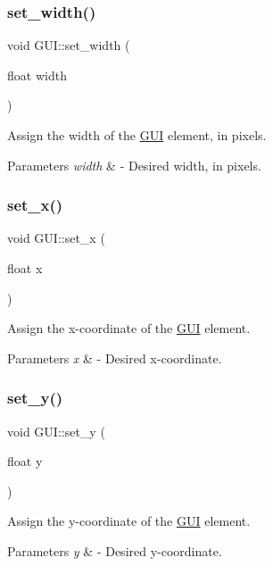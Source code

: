 \subsubsection{\texorpdfstring{set\+\_\+width()}{set\_width()}}
{\footnotesize\ttfamily void G\+U\+I\+::set\+\_\+width (\begin{DoxyParamCaption}\item[{float}]{width }\end{DoxyParamCaption})}

Assign the width of the \mbox{\hyperlink{class_g_u_i}{G\+UI}} element, in pixels. 
\begin{DoxyParams}{Parameters}
{\em width} & -\/ Desired width, in pixels. \\
\hline
\end{DoxyParams}
\mbox{\label{class_g_u_i_a677bae0d1184e72deaf25fac052a8f95}} 
\subsubsection{\texorpdfstring{set\+\_\+x()}{set\_x()}}
{\footnotesize\ttfamily void G\+U\+I\+::set\+\_\+x (\begin{DoxyParamCaption}\item[{float}]{x }\end{DoxyParamCaption})}

Assign the x-\/coordinate of the \mbox{\hyperlink{class_g_u_i}{G\+UI}} element. 
\begin{DoxyParams}{Parameters}
{\em x} & -\/ Desired x-\/coordinate. \\
\hline
\end{DoxyParams}
\mbox{\label{class_g_u_i_aad88f8d97f43cd47a4245d5dc5a49e45}} 
\subsubsection{\texorpdfstring{set\+\_\+y()}{set\_y()}}
{\footnotesize\ttfamily void G\+U\+I\+::set\+\_\+y (\begin{DoxyParamCaption}\item[{float}]{y }\end{DoxyParamCaption})}

Assign the y-\/coordinate of the \mbox{\hyperlink{class_g_u_i}{G\+UI}} element. 
\begin{DoxyParams}{Parameters}
{\em y} & -\/ Desired y-\/coordinate. \\
\hline
\end{DoxyParams}
\mbox{\label{class_g_u_i_a947e568bf884a8798e3e368417f662c7}} 
